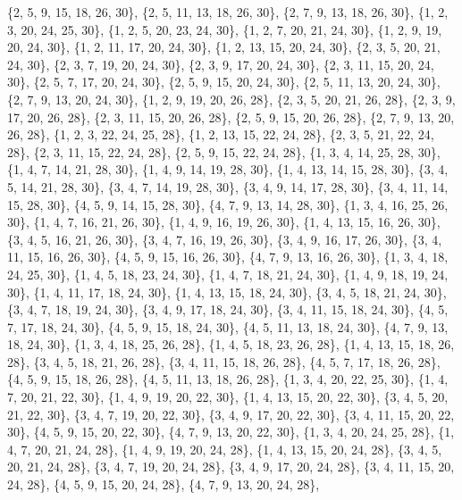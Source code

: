 \documentclass[11pt,a4paper]{article}
\begin{document}
{\{2, 5, 9, 15, 18, 26, 30\}, \{2, 5, 11, 13, 18, 26, 30\}, \{2, 7, 9, 13, 18, 26, 30\}, \{1, 2, 3, 20, 24, 25, 30\}, \{1, 2, 5, 20, 23, 24, 30\},
\{1, 2, 7, 20, 21, 24, 30\}, \{1, 2, 9, 19, 20, 24, 30\}, \{1, 2, 11, 17, 20, 24, 30\}, \{1, 2, 13, 15, 20, 24, 30\}, \{2, 3, 5, 20, 21, 24, 30\},
\{2, 3, 7, 19, 20, 24, 30\}, \{2, 3, 9, 17, 20, 24, 30\}, \{2, 3, 11, 15, 20, 24, 30\}, \{2, 5, 7, 17, 20, 24, 30\}, \{2, 5, 9, 15, 20, 24, 30\},
\{2, 5, 11, 13, 20, 24, 30\}, \{2, 7, 9, 13, 20, 24, 30\}, \{1, 2, 9, 19, 20, 26, 28\}, \{2, 3, 5, 20, 21, 26, 28\}, \{2, 3, 9, 17, 20, 26, 28\},
\{2, 3, 11, 15, 20, 26, 28\}, \{2, 5, 9, 15, 20, 26, 28\}, \{2, 7, 9, 13, 20, 26, 28\}, \{1, 2, 3, 22, 24, 25, 28\}, \{1, 2, 13, 15, 22, 24, 28\},
\{2, 3, 5, 21, 22, 24, 28\}, \{2, 3, 11, 15, 22, 24, 28\}, \{2, 5, 9, 15, 22, 24, 28\}, \{1, 3, 4, 14, 25, 28, 30\}, \{1, 4, 7, 14, 21, 28, 30\},
\{1, 4, 9, 14, 19, 28, 30\}, \{1, 4, 13, 14, 15, 28, 30\}, \{3, 4, 5, 14, 21, 28, 30\}, \{3, 4, 7, 14, 19, 28, 30\}, \{3, 4, 9, 14, 17, 28, 30\},
\{3, 4, 11, 14, 15, 28, 30\}, \{4, 5, 9, 14, 15, 28, 30\}, \{4, 7, 9, 13, 14, 28, 30\}, \{1, 3, 4, 16, 25, 26, 30\}, \{1, 4, 7, 16, 21, 26, 30\},
\{1, 4, 9, 16, 19, 26, 30\}, \{1, 4, 13, 15, 16, 26, 30\}, \{3, 4, 5, 16, 21, 26, 30\}, \{3, 4, 7, 16, 19, 26, 30\}, \{3, 4, 9, 16, 17, 26, 30\},
\{3, 4, 11, 15, 16, 26, 30\}, \{4, 5, 9, 15, 16, 26, 30\}, \{4, 7, 9, 13, 16, 26, 30\}, \{1, 3, 4, 18, 24, 25, 30\}, \{1, 4, 5, 18, 23, 24, 30\},
\{1, 4, 7, 18, 21, 24, 30\}, \{1, 4, 9, 18, 19, 24, 30\}, \{1, 4, 11, 17, 18, 24, 30\}, \{1, 4, 13, 15, 18, 24, 30\}, \{3, 4, 5, 18, 21, 24, 30\},
\{3, 4, 7, 18, 19, 24, 30\}, \{3, 4, 9, 17, 18, 24, 30\}, \{3, 4, 11, 15, 18, 24, 30\}, \{4, 5, 7, 17, 18, 24, 30\}, \{4, 5, 9, 15, 18, 24, 30\},
\{4, 5, 11, 13, 18, 24, 30\}, \{4, 7, 9, 13, 18, 24, 30\}, \{1, 3, 4, 18, 25, 26, 28\}, \{1, 4, 5, 18, 23, 26, 28\}, \{1, 4, 13, 15, 18, 26, 28\},
\{3, 4, 5, 18, 21, 26, 28\}, \{3, 4, 11, 15, 18, 26, 28\}, \{4, 5, 7, 17, 18, 26, 28\}, \{4, 5, 9, 15, 18, 26, 28\}, \{4, 5, 11, 13, 18, 26, 28\},
\{1, 3, 4, 20, 22, 25, 30\}, \{1, 4, 7, 20, 21, 22, 30\}, \{1, 4, 9, 19, 20, 22, 30\}, \{1, 4, 13, 15, 20, 22, 30\}, \{3, 4, 5, 20, 21, 22, 30\},
\{3, 4, 7, 19, 20, 22, 30\}, \{3, 4, 9, 17, 20, 22, 30\}, \{3, 4, 11, 15, 20, 22, 30\}, \{4, 5, 9, 15, 20, 22, 30\}, \{4, 7, 9, 13, 20, 22, 30\},
\{1, 3, 4, 20, 24, 25, 28\}, \{1, 4, 7, 20, 21, 24, 28\}, \{1, 4, 9, 19, 20, 24, 28\}, \{1, 4, 13, 15, 20, 24, 28\}, \{3, 4, 5, 20, 21, 24, 28\},
\{3, 4, 7, 19, 20, 24, 28\}, \{3, 4, 9, 17, 20, 24, 28\}, \{3, 4, 11, 15, 20, 24, 28\}, \{4, 5, 9, 15, 20, 24, 28\}, \{4, 7, 9, 13, 20, 24, 28\},
}
\end{document}
